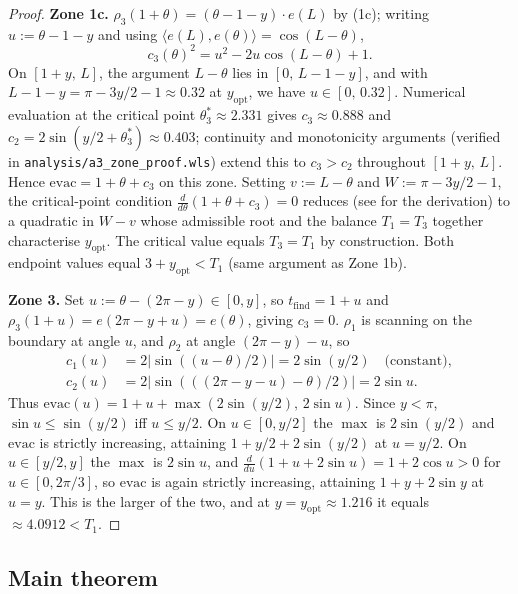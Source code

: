 \documentclass[11pt]{article}
\theoremstyle{plain}
\theoremstyle{definition}
\theoremstyle{remark}
\begin{document}
\begin{proof}
\textbf{Zone 1c.} $\rho_3(1+\theta) = (\theta - 1 - y) \cdot e(L)$ by
(1c); writing $u := \theta - 1 - y$ and using $\langle
e(L), e(\theta) \rangle = \cos(L - \theta)$,
\[
c_3(\theta)^2 = u^2 - 2u\cos(L - \theta) + 1.
\]
On $[1+y,\, L]$, the argument $L - \theta$ lies in $[0,\, L - 1 - y]$,
and with $L - 1 - y = \pi - 3y/2 - 1 \approx 0.32$ at $y_{\mathrm{opt}}$,
we have $u \in [0,\, 0.32]$. Numerical evaluation at the critical point
$\theta_3^* \approx 2.331$ gives $c_3 \approx 0.888$ and $c_2 = 2\sin(y/2
+ \theta_3^*) \approx 0.403$; continuity and monotonicity arguments
(verified in \texttt{analysis/a3\_zone\_proof.wls}) extend this to $c_3
> c_2$ throughout $[1+y,\, L]$. Hence $\mathrm{evac} = 1 + \theta + c_3$
on this zone. Setting $v := L - \theta$ and $W := \pi - 3y/2 - 1$, the
critical-point condition $\frac{d}{d\theta}(1 + \theta + c_3) = 0$
reduces (see  for the derivation) to a
quadratic in $W - v$ whose admissible root and the balance $T_1 = T_3$
together characterise $y_{\mathrm{opt}}$. The critical value equals
$T_3 = T_1$ by construction. Both endpoint values equal $3 +
y_{\mathrm{opt}} < T_1$ (same argument as Zone 1b).

\textbf{Zone 3.} Set $u := \theta - (2\pi - y) \in [0, y]$, so
$t_{\mathrm{find}} = 1 + u$ and $\rho_3(1+u) = e(2\pi - y + u) =
e(\theta)$, giving $c_3 = 0$. $\rho_1$ is scanning on the boundary at
angle $u$, and $\rho_2$ at angle $(2\pi - y) - u$, so
\begin{align*}
c_1(u) &= 2\lvert\sin((u - \theta)/2)\rvert = 2\sin(y/2) \quad
\text{(constant)},\\
c_2(u) &= 2\lvert\sin(((2\pi - y - u) - \theta)/2)\rvert = 2\sin u.
\end{align*}
Thus $\mathrm{evac}(u) = 1 + u + \max(2\sin(y/2),\, 2\sin u)$. Since
$y < \pi$, $\sin u \le \sin(y/2)$ iff $u \le y/2$. On $u \in [0,
y/2]$ the $\max$ is $2\sin(y/2)$ and $\mathrm{evac}$ is strictly
increasing, attaining $1 + y/2 + 2\sin(y/2)$ at $u = y/2$. On $u \in
[y/2, y]$ the $\max$ is $2\sin u$, and $\frac{d}{du}(1 + u + 2\sin u) =
1 + 2\cos u > 0$ for $u \in [0, 2\pi/3]$, so $\mathrm{evac}$ is again
strictly increasing, attaining $1 + y + 2\sin y$ at $u = y$. This is
the larger of the two, and at $y = y_{\mathrm{opt}} \approx 1.216$ it
equals $\approx 4.0912 < T_1$.
\end{proof}

\subsection{Main theorem}
\end{document}
